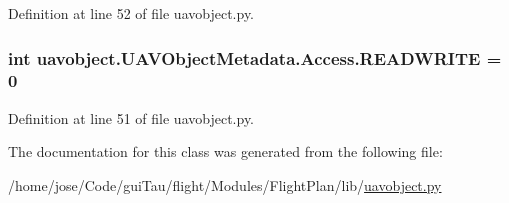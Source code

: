 Definition at line 52 of file uavobject.\-py.

\hypertarget{classuavobject_1_1_u_a_v_object_metadata_1_1_access_ad34b855419d508cfdbeb7a63feda9d23}{
\subsubsection[{R\-E\-A\-D\-W\-R\-I\-T\-E}]{\setlength{\rightskip}{0pt plus 5cm}int uavobject.\-U\-A\-V\-Object\-Metadata.\-Access.\-R\-E\-A\-D\-W\-R\-I\-T\-E = 0\hspace{0.3cm}{\ttfamily [static]}}}\label{classuavobject_1_1_u_a_v_object_metadata_1_1_access_ad34b855419d508cfdbeb7a63feda9d23}


Definition at line 51 of file uavobject.\-py.



The documentation for this class was generated from the following file\-:\begin{DoxyCompactItemize}
\item 
/home/jose/\-Code/gui\-Tau/flight/\-Modules/\-Flight\-Plan/lib/\hyperlink{uavobject_8py}{uavobject.\-py}\end{DoxyCompactItemize}
